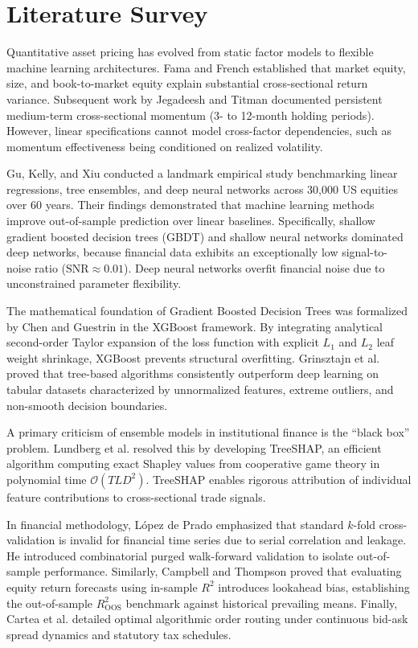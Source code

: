\section{Literature Survey}
\label{sec:literature}
Quantitative asset pricing has evolved from static factor models to flexible machine learning architectures. Fama and French \cite{fama1993common} established that market equity, size, and book-to-market equity explain substantial cross-sectional return variance. Subsequent work by Jegadeesh and Titman \cite{jegadeesh1993returns} documented persistent medium-term cross-sectional momentum (3- to 12-month holding periods). However, linear specifications cannot model cross-factor dependencies, such as momentum effectiveness being conditioned on realized volatility.

Gu, Kelly, and Xiu \cite{gu2020empirical} conducted a landmark empirical study benchmarking linear regressions, tree ensembles, and deep neural networks across 30,000 US equities over 60 years. Their findings demonstrated that machine learning methods improve out-of-sample prediction over linear baselines. Specifically, shallow gradient boosted decision trees (GBDT) and shallow neural networks dominated deep networks, because financial data exhibits an exceptionally low signal-to-noise ratio ($\text{SNR} \approx 0.01$). Deep neural networks overfit financial noise due to unconstrained parameter flexibility.

The mathematical foundation of Gradient Boosted Decision Trees was formalized by Chen and Guestrin \cite{chen2016xgboost} in the XGBoost framework. By integrating analytical second-order Taylor expansion of the loss function with explicit $L_1$ and $L_2$ leaf weight shrinkage, XGBoost prevents structural overfitting. Grinsztajn et al. \cite{grinsztajn2022why} proved that tree-based algorithms consistently outperform deep learning on tabular datasets characterized by unnormalized features, extreme outliers, and non-smooth decision boundaries.

A primary criticism of ensemble models in institutional finance is the ``black box'' problem. Lundberg et al. \cite{lundberg2020local} resolved this by developing TreeSHAP, an efficient algorithm computing exact Shapley values from cooperative game theory in polynomial time $\mathcal{O}(T L D^2)$. TreeSHAP enables rigorous attribution of individual feature contributions to cross-sectional trade signals.

In financial methodology, López de Prado \cite{lopezdeprado2018advances} emphasized that standard $k$-fold cross-validation is invalid for financial time series due to serial correlation and leakage. He introduced combinatorial purged walk-forward validation to isolate out-of-sample performance. Similarly, Campbell and Thompson \cite{campbell2008predicting} proved that evaluating equity return forecasts using in-sample $R^2$ introduces lookahead bias, establishing the out-of-sample $R^2_{\text{OOS}}$ benchmark against historical prevailing means. Finally, Cartea et al. \cite{cartea2015algorithmic} detailed optimal algorithmic order routing under continuous bid-ask spread dynamics and statutory tax schedules.


